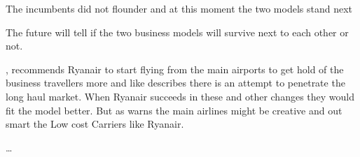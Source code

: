 \documentclass[a4paper, 11pt]{article}
\begin{document}
The incumbents did not flounder and at this moment the two models stand next

The future will tell if the two business models will survive next to each other or not.

\cite{Diaconu}, recommends Ryanair to start flying from the main airports to get hold of the business travellers more and like \cite{Eurocontrol2018} describes there is an attempt to penetrate the long haul market. When Ryanair succeeds in these and other changes they would fit the model better. But as \cite{Christensen2015} warns the main airlines might be creative and out smart the Low cost Carriers like Ryanair.

\ldots


\renewcommand{\textbf}{}
\renewcommand{\bf}{}
{}
\end{document}

